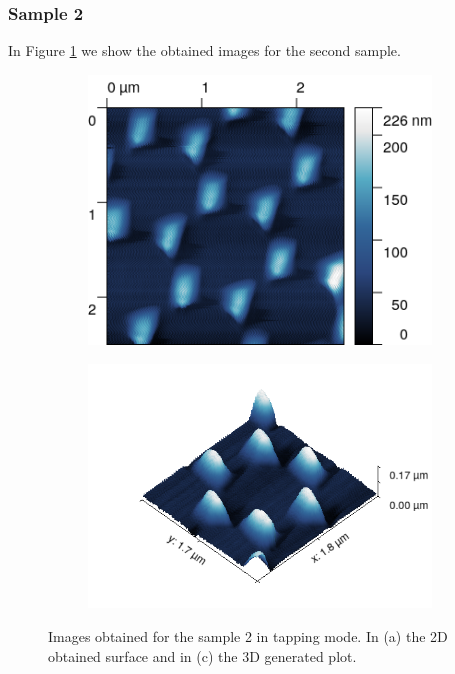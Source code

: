 \documentclass[11pt,a4paper]{article}
\begin{document}
\subsubsection{Sample 2}

In Figure \ref{fig:tapping_sample2} we show the obtained images for the second sample.

\begin{figure}[H]
\centering
\begin{subfigure}[b]{0.45\textwidth}
\includegraphics[width=\textwidth]{tm_sample2}
\caption{}
\end{subfigure}
\begin{subfigure}[b]{0.45\textwidth}
\includegraphics[width=\textwidth]{tm_sample2_3D}
\caption{}
\end{subfigure}
\caption{Images obtained for the sample 2 in tapping mode. In (a) the 2D obtained surface and in (c) the 3D generated plot.}
\label{fig:tapping_sample2}
\end{figure}
\end{document}
